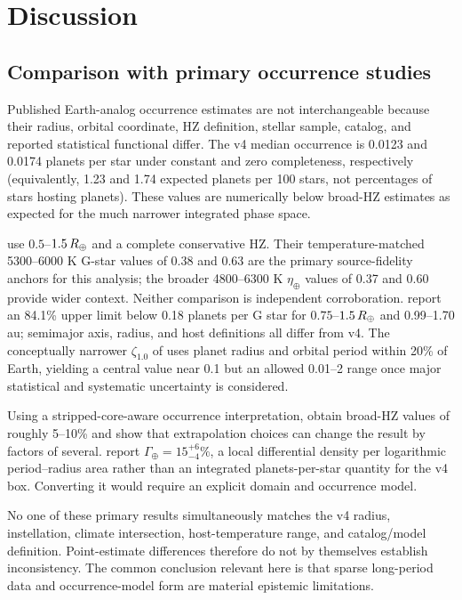 \section{Discussion}\label{sec:discussion}

\subsection{Comparison with primary occurrence studies}

Published Earth-analog occurrence estimates are not interchangeable because
their radius, orbital coordinate, HZ definition, stellar sample, catalog, and
reported statistical functional differ. The v4 median occurrence is 0.0123
and 0.0174 planets per star under constant and zero completeness, respectively
(equivalently, 1.23 and 1.74 expected planets per 100 stars, not percentages of
stars hosting planets). These values are numerically below broad-HZ estimates
as expected for the much narrower integrated phase space.

\citet{Bryson2021} use $0.5$--$1.5\,R_{\oplus}$ and a complete conservative HZ.
Their temperature-matched 5300--6000 K G-star values of 0.38 and 0.63 are the
primary source-fidelity anchors for this analysis; the broader 4800--6300 K
$\eta_\oplus$ values of 0.37 and 0.60 provide wider context. Neither comparison
is independent corroboration. \citet{Kunimoto2020} report an 84.1\% upper limit below 0.18
planets per G star for $0.75$--$1.5\,R_{\oplus}$ and 0.99--1.70 au; semimajor axis,
radius, and host definitions all differ from v4. The conceptually narrower
$\zeta_{1.0}$ of \citet{Burke2015} uses planet radius and orbital period within
20\% of Earth, yielding a central value near 0.1 but an allowed 0.01--2 range
once major statistical and systematic uncertainty is considered.

Using a stripped-core-aware occurrence interpretation, \citet{Pascucci2019}
obtain broad-HZ values of roughly 5--10\% and show that extrapolation choices
can change the result by factors of several. \citet{Bergsten2022} report
$\Gamma_\oplus=15^{+6}_{-4}\%$, a local differential density per logarithmic
period--radius area rather than an integrated planets-per-star quantity for the
v4 box. Converting it would require an explicit domain and occurrence model.

No one of these primary results simultaneously matches the v4 radius,
instellation, climate intersection, host-temperature range, and catalog/model
definition. Point-estimate differences therefore do not by themselves
establish inconsistency. The common conclusion relevant here is that sparse
long-period data and occurrence-model form are material epistemic limitations.

